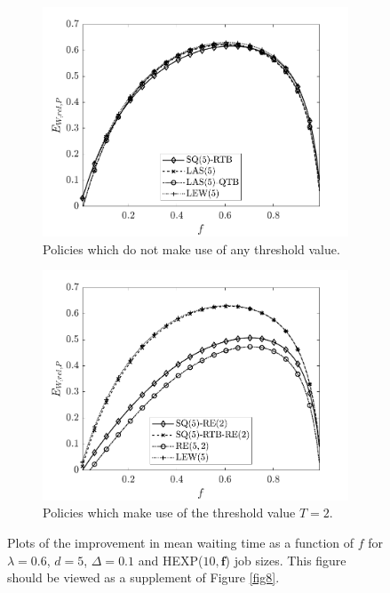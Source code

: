 \documentclass[12pt]{report}
\begin{document}
\begin{figure}[t]
\begin{center}
\begin{subfigure}{0.43\textwidth}
\centering
\captionsetup{width=.8\linewidth}
\includegraphics[width=1\linewidth]{figures/Chapter7/fig9a.pdf}
\caption{Policies which do not make use of any threshold value.}
\label{fig9a}
\end{subfigure}
\begin{subfigure}{.43\textwidth}
\centering
\captionsetup{width=.8\linewidth}
\includegraphics[width=1\linewidth]{figures/Chapter7/fig9b.pdf}
\caption{Policies which make use of the threshold value $T=2$.}
\label{fig9b}
\end{subfigure}
\caption{Plots of the improvement in mean waiting time as a function of $f$ for $\lambda=0.6$, $d=5$, $\Delta=0.1$ and HEXP($10,\textbf{f}$) job sizes. This figure should be viewed as a supplement of Figure \ref{fig8}.}
\label{fig9}
\end{center}
\end{figure}
\end{document}

